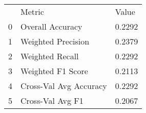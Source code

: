 \begin{tabular}{lll}
 & Metric & Value \\
0 & Overall Accuracy & 0.2292 \\
1 & Weighted Precision & 0.2379 \\
2 & Weighted Recall & 0.2292 \\
3 & Weighted F1 Score & 0.2113 \\
4 & Cross-Val Avg Accuracy & 0.2292 \\
5 & Cross-Val Avg F1 & 0.2067 \\
\end{tabular}
